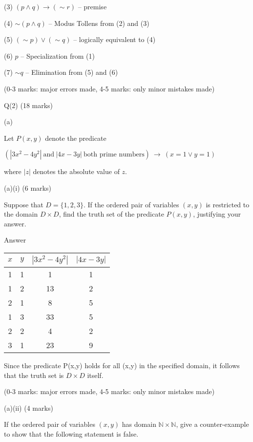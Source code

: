 \documentclass[a4paper,12pt,oneside]{book}
\theoremstyle{definition}
\begin{document}
(3) $(p \wedge q) \rightarrow (\sim r)$ -- premise

(4) $\sim (p \wedge q)$ -- Modus Tollens from (2) and (3)

(5) $(\sim p) \vee (\sim q)$ -- logically equivalent to (4)

(6) $p$ -- Specialization from (1)

(7) $\sim q$ -- Elimination from (5) and (6) 

(0-3 marks: major errors made, 4-5 marks: only minor mistakes made)


\newpage

Q(2) (18 marks)

(a)

Let $P(x,y)$ denote the predicate

$(|3x^2-4y^2| \ \text{and} \ |4x-3y| \ \text{both prime numbers}) \ \rightarrow \ (x=1 \vee y=1)$

where $|z|$ denotes the absolute value of $z$.

(a)(i) (6 marks)

Suppose that $D = \{ 1,2,3 \}$. If the ordered pair of variables $(x,y)$ is restricted to the domain $D \times D$, find the truth set of the predicate $P(x,y)$, justifying your answer.

Answer

\begin{center}
	\begin{tabular}{|c|c|c|c|}
		\hline
 		$x$ & $y$ & $|3x^2-4y^2|$ & $|4x-3y|$ \\
 		\hline
 		1 & 1 & 1 & 1 \\
 		\hline
 		1 & 2 & 13 & 2 \\
 		\hline
 		2 & 1 & 8 & 5 \\
 		\hline
 		1 & 3 & 33 & 5 \\
 		\hline
 		2 & 2 & 4 & 2 \\
 		\hline
 		3 & 1 & 23 & 9 \\
 		\hline  
	\end{tabular} 
\end{center}

Since the predicate P(x,y) holds for all (x,y) in the specified domain, it follows that the truth set is $D \times D$ itself.

(0-3 marks: major errors made, 4-5 marks: only minor mistakes made)

(a)(ii) (4 marks)

If the ordered pair of variables $(x,y)$ has domain $\mathbb{N} \times \mathbb{N}$, give a counter-example to show that the following statement is false.
\end{document}
